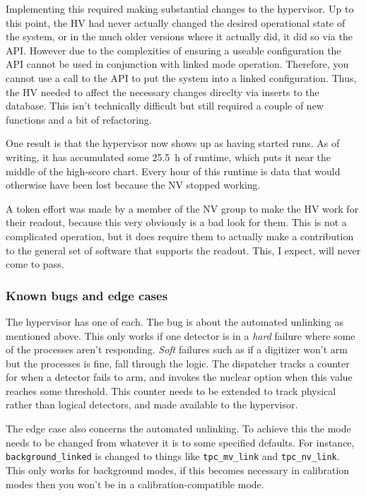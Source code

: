 Implementing this required making substantial changes to the hypervisor.
Up to this point, the HV had never actually changed the desired operational state of the system, or in the much older versions where it actually did, it did so via the API.
However due to the complexities of ensuring a useable configuration the API cannot be used in conjunction with linked mode operation.
Therefore, you cannot use a call to the API to put the system into a linked configuration.
Thus, the HV needed to affect the necessary changes direclty via inserts to the database.
This isn't technically difficult but still required a couple of new functions and a bit of refactoring.

One result is that the hypervisor now shows up as having started runs.
As of writing, it has accumulated some \SI{25.5}{\hour} of runtime, which puts it near the middle of the high-score chart.
Every hour of this runtime is data that would otherwise have been lost because the NV stopped working.

A token effort was made by a member of the NV group to make the HV work for their readout, because this very obviously is a bad look for them.
This is not a complicated operation, but it does require them to actually make a contribution to the general set of software that supports the readout.
This, I expect, will never come to pass.

\subsubsection{Known bugs and edge cases}

The hypervisor has one of each.
The bug is about the automated unlinking as mentioned above.
This only works if one detector is in a \textit{hard} failure where some of the processes aren't responding.
\textit{Soft} failures such as if a digitizer won't arm but the processes is fine, fall through the logic.
The dispatcher tracks a counter for when a detector fails to arm, and invokes the nuclear option when this value reaches some threshold.
This counter needs to be extended to track physical rather than logical detectors, and made available to the hypervisor.

The edge case also concerns the automated unlinking.
To achieve this the mode needs to be changed from whatever it is to some specified defaults.
For instance, \texttt{background\_linked} is changed to things like \texttt{tpc\_mv\_link} and \texttt{tpc\_nv\_link}.
This only works for background modes, if this becomes necessary in calibration modes then you won't be in a calibration-compatible mode.

